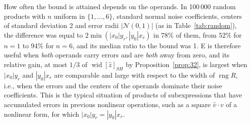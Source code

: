 \documentclass[10pt]{article}
\theoremstyle{definition}
\newcommand{\rng}{\operatorname{rng}}
\newcommand{\wid}{\operatorname{wid}}
\begin{document}
How often the bound is attained depends on the operands. In 100\,000 random products with $n$ uniform in $\{1,\dots,6\}$, standard normal noise coefficients, centers of standard deviation 2 and error radii $|\mathcal N(0,1)|$ (as in Table~\ref{tab:random}), the difference was equal to $2\min(|x_0|y_r,|y_0|x_r)$ in 78\% of them, from 52\% for $n=1$ to 94\% for $n=6$, and its median ratio to the bound was 1. E is therefore useful when \emph{both} operands carry errors and are \emph{both} away from zero, and its relative gain, at most $1/3$ of $\wid[\hat z]_{SH}$ by Proposition~\ref{prop:32}, is largest when $|x_0|y_r$ and $|y_0|x_r$ are comparable and large with respect to the width of $\rng R$, i.e., when the errors and the centers of the operands dominate their noise coefficients. This is the typical situation of products of subexpressions that have accumulated errors in previous nonlinear operations, such as a square $\hat v\cdot\hat v$ of a nonlinear form, for which $|x_0|y_r=|y_0|x_r$.
\end{document}
